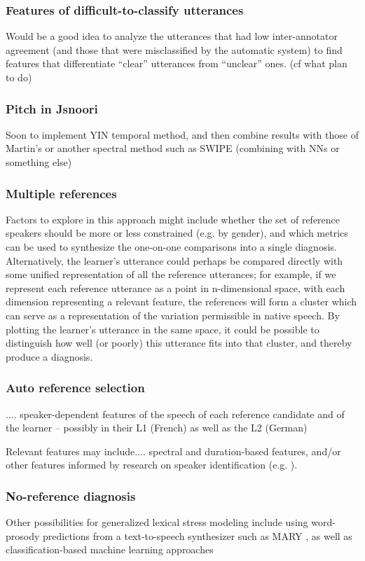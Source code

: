 	\subsubsection{Features of difficult-to-classify utterances}
	Would be a good idea to analyze the utterances that had low inter-annotator agreement (and those that were misclassified by the automatic system) to find features that differentiate ``clear'' utterances from ``unclear'' ones. (cf what \textcite{Michaux2013} plan to do)
	
	\subsubsection{Pitch in Jsnoori}
	Soon to implement YIN \citep{Cheveigne2002} temporal method, and then combine results with those of Martin's or another spectral method such as SWIPE \citep{Camacho2007} (combining with NNs or something else)
	
	
	\subsubsection{Multiple references}
	Factors to explore in this approach might include whether the set of reference speakers should be more or less constrained (e.g. by gender), and which metrics can be used to synthesize the one-on-one comparisons into a single diagnosis.
	Alternatively, the learner's utterance could perhaps be compared directly with some unified representation of all the reference utterances; for example, if we represent each reference utterance as a point in n-dimensional space, with each dimension representing a relevant feature, the references will form a cluster which can serve as a representation of the variation permissible in native speech. By plotting the learner's utterance in the same space, it could be possible to distinguish how well (or poorly) this utterance fits into that cluster, and thereby produce a diagnosis.
	
	\subsubsection{Auto reference selection}
	.... speaker-dependent features of the speech of each reference candidate and of the learner -- possibly in their L1 (French) as well as the L2 (German) 
	
	 Relevant features may include.... spectral and duration-based features, and/or other features informed by research on speaker identification (e.g. \cite{Shriberg2005}). 
	 
	 \subsubsection{No-reference diagnosis}
	 
	 Other possibilities for generalized lexical stress modeling include using word-prosody predictions from a text-to-speech synthesizer such as MARY \citep{Schroeder2003}, as well as 
classification-based machine learning approaches 
